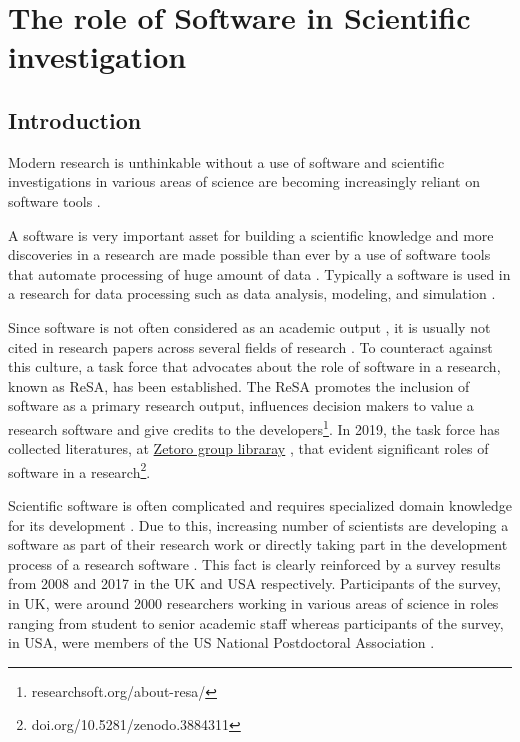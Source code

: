 \chapter{The role of Software in Scientific investigation}
\label{ch:Roles}

%

\section{Introduction}
\label{sec:background:intro}

Modern research is unthinkable without a use of software and scientific investigations in various areas of science are becoming increasingly reliant on software tools \citep{goble2014better, wilson2014best, storer2017bridging}.

A software is very important asset for building a scientific knowledge and more discoveries in a research are made possible than ever by a use of software tools that automate processing of huge amount of data \citep{jimenez2017four}. Typically a software is used in a research for data processing such as data analysis, modeling, and simulation \cite{hannay2009scientists, pan2016disciplinary}.

Since software is not often considered as an academic output \citep{yang2018important, pan2016disciplinary}, it is usually not cited in research papers across several fields of research  \cite{pan2016disciplinary}. To counteract against this culture, a task force that advocates about the role of software in a research, known as \ac{ReSA}, has been established. The \ac{ReSA} promotes the inclusion of software as a primary research output, influences decision makers to value a research software and give credits to the developers\footnote{researchsoft.org/about-resa/}. In 2019, the task force has collected literatures, at \href{https://www.zotero.org/groups/2400609/resa/library}{Zetoro group libraray} , that evident significant roles of software in a research\footnote{doi.org/10.5281/zenodo.3884311}.  

Scientific software is often complicated and requires specialized domain knowledge for its development \citep{wilson2014best}. Due to this, increasing number of scientists are developing a software as part of their research work or directly taking part in the development process of a research software \citep{jimenez2017four, kanewala2014testing}. This fact is clearly reinforced by a  survey results  from 2008 and 2017  in the \ac{UK} and \ac{USA} respectively. Participants of the survey, in UK, were around 2000 researchers working in various areas of science in roles ranging from student to senior academic staff whereas participants of the survey, in \ac{USA}, were members of the US National Postdoctoral Association \citep{merali2010computational, hettrick2014uk, nangia2017track}.  

